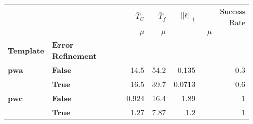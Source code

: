 \begin{tabular}{llrrrr}
\toprule
    &       & $\bar{T}_C$ & $\bar{T}_f$ & $ ||\bar{\epsilon}||_1$ & Success Rate \\
    &       &       $\mu$ &       $\mu$ & \multicolumn{2}{c}{$\mu$} \\
\textbf{Template} & \textbf{Error Refinement} &             &             &                         &              \\
\midrule
\textbf{pwa} & \textbf{False} &        14.5 &        54.2 &                   0.135 &          0.3 \\
    & \textbf{True } &        16.5 &        39.7 &                  0.0713 &          0.6 \\
\textbf{pwc} & \textbf{False} &       0.924 &        16.4 &                    1.89 &            1 \\
    & \textbf{True } &        1.27 &        7.87 &                     1.2 &            1 \\
\bottomrule
\end{tabular}
